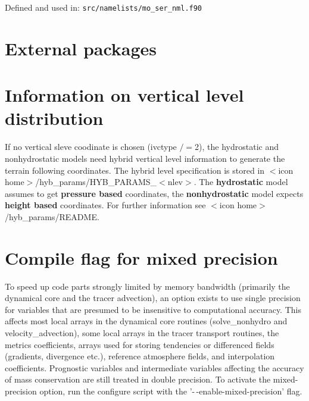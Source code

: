 Defined and used in: \verb+src/namelists/mo_ser_nml.f90+

\section{External packages}



\section{Information on vertical level distribution}

If no vertical sleve coodinate is chosen (ivctype $/=$2), the hydrostatic and nonhydrostatic models need hybrid vertical level information to generate the
terrain following coordinates. The hybrid level specification is stored in
$<$icon home$>$/hyb\_params/HYB\_PARAMS\_$<$nlev$>$.
The \textbf{hydrostatic} model assumes to get \textbf{pressure based} coordinates, the \textbf{nonhydrostatic}
model expects \textbf{height based} coordinates. For further information see $<$icon home$>$/hyb\_params/README.

\section{Compile flag for mixed precision}

To speed up code parts strongly limited by memory bandwidth (primarily the dynamical core and the tracer advection), 
an option exists to use single precision for variables that are presumed to be insensitive to computational accuracy.
This affects most local arrays in the dynamical core routines (solve\_nonhydro and velocity\_advection), some local
arrays in the tracer transport routines, the metrics coefficients,
arrays used for storing tendencies or differenced fields (gradients, divergence etc.), reference atmosphere fields,
and interpolation coefficients. Prognostic variables and intermediate variables affecting the accuracy of mass conservation
are still treated in double precision. To activate the mixed-precision option, run the configure script with the 
'-\,-enable-mixed-precision' flag.




